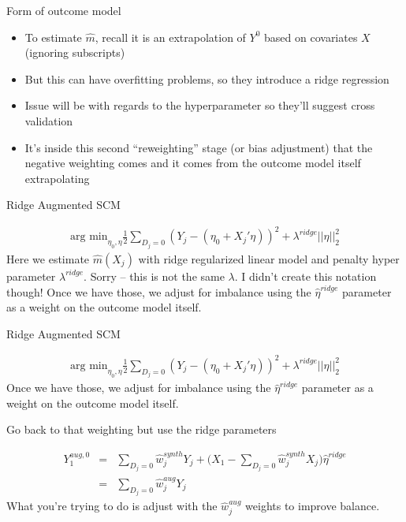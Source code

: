 \documentclass{beamer}
\begin{document}
\begin{frame}{Form of outcome model}

\begin{itemize}

\item To estimate $\widehat{m}$, recall it is an extrapolation of $Y^0$ based on covariates $X$ (ignoring subscripts)
\item But this can have overfitting problems, so they introduce a ridge regression
\item Issue will be with regards to the hyperparameter so they'll suggest cross validation
\item It's inside this second ``reweighting'' stage (or bias adjustment) that the negative weighting comes and it comes from the outcome model itself extrapolating

\end{itemize}

\end{frame}




\begin{frame}{Ridge Augmented SCM}

\begin{eqnarray*}
\textrm{arg min}_{\eta_0,\eta} \frac{1}{2} \sum_{D_j=0} (Y_j - (\eta_0 + X_j'\eta))^2 + \lambda^{ridge} || \eta ||_2^2
\end{eqnarray*}Here we estimate $\widehat{m}(X_j)$ with ridge regularized linear model and penalty hyper parameter $\lambda^{ridge}$. Sorry -- this is not the same $\lambda$. I didn't create this notation though! Once we have those, we adjust for imbalance using the $\widehat{\eta}^{ridge}$ parameter as a weight on the outcome model itself. 

\end{frame}

\begin{frame}{Ridge Augmented SCM}

\begin{eqnarray*}
\textrm{arg min}_{\eta_0,\eta} \frac{1}{2} \sum_{D_j=0} (Y_j - (\eta_0 + X_j'\eta))^2 + \lambda^{ridge} || \eta ||_2^2
\end{eqnarray*}Once we have those, we adjust for imbalance using the $\widehat{\eta}^{ridge}$ parameter as a weight on the outcome model itself. 

\end{frame}




\begin{frame}{Go back to that weighting but use the ridge parameters}

\begin{eqnarray*}
Y_1^{aug,0} &=& \sum_{D_j=0} \widehat{w}_j^{synth} Y_{j} + \bigg ( X_1 - \sum_{D_j=0} \widehat{w}_j^{synth} X_j \bigg ) \widehat{\eta}^{ridge} \\
&=& \sum_{D_j=0} \widehat{w}_j^{aug}Y_j
\end{eqnarray*}What you're trying to do is adjust with the $\widehat{w}_j^{aug}$ weights to improve balance.  

\end{frame}
\end{document}
